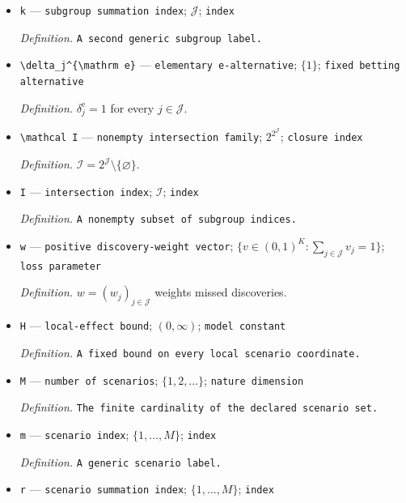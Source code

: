 \documentclass{article}
\begin{document}
\begin{itemize}
  \par\smallskip\noindent\emph{Definition.} \texttt{A generic subgroup label.}
  \item \texttt{k} --- \texttt{subgroup summation index}; \(\mathcal J\); \texttt{index}
  \par\smallskip\noindent\emph{Definition.} \texttt{A second generic subgroup label.}
  \item \texttt{\textbackslash{}\allowbreak{}delta\_\allowbreak{}j\textasciicircum{}\{\textbackslash{}\allowbreak{}mathrm e\}\allowbreak{}} --- \texttt{elementary e-\allowbreak{}alternative}; \(\{1\}\); \texttt{fixed betting alternative}
  \par\smallskip\noindent\emph{Definition.} \(\delta_j^{\mathrm e}=1\) for every \(j\in\mathcal J\).
  \item \texttt{\textbackslash{}\allowbreak{}mathcal I} --- \texttt{nonempty intersection family}; \(2^{2^{\mathcal J}}\); \texttt{closure index}
  \par\smallskip\noindent\emph{Definition.} \(\mathcal I=2^{\mathcal J}\setminus\{\varnothing\}\).
  \item \texttt{I} --- \texttt{intersection index}; \(\mathcal I\); \texttt{index}
  \par\smallskip\noindent\emph{Definition.} \texttt{A nonempty subset of subgroup indices.}
  \item \texttt{w} --- \texttt{positive discovery-\allowbreak{}weight vector}; \(\{v\in(0,1)^K:\sum_{j\in\mathcal J}v_j=1\}\); \texttt{loss parameter}
  \par\smallskip\noindent\emph{Definition.} \(w=(w_j)_{j\in\mathcal J}\) weights missed discoveries.
  \item \texttt{H} --- \texttt{local-\allowbreak{}effect bound}; \((0,\infty)\); \texttt{model constant}
  \par\smallskip\noindent\emph{Definition.} \texttt{A fixed bound on every local scenario coordinate.}
  \item \texttt{M} --- \texttt{number of scenarios}; \(\{1,2,\ldots\}\); \texttt{nature dimension}
  \par\smallskip\noindent\emph{Definition.} \texttt{The finite cardinality of the declared scenario set.}
  \item \texttt{m} --- \texttt{scenario index}; \(\{1,\ldots,M\}\); \texttt{index}
  \par\smallskip\noindent\emph{Definition.} \texttt{A generic scenario label.}
  \item \texttt{r} --- \texttt{scenario summation index}; \(\{1,\ldots,M\}\); \texttt{index}

\end{itemize}
\end{document}
